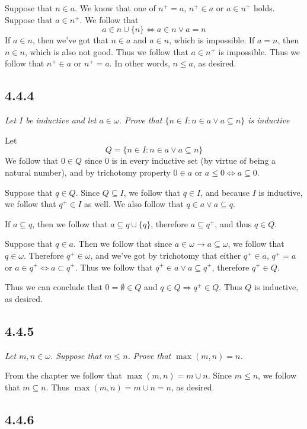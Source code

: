 \documentclass[11pt,oneside,titlepage]{book}
\DeclareMathOperator \lra {\Leftrightarrow}
\DeclareMathOperator \ra {\Rightarrow}
\begin{document}
Suppose that $n \in a$. We know that one of  $n^+ = a$, $n^+ \in a$ or $a \in n^+$ holds.
Suppose that $a \in n^+$. We follow that
$$a \in n \cup \{n\} \lra a \in n \lor a = n$$
If $a \in n$, then we've got that $n \in a$ and $a \in n$, which is impossible. If $a = n$,
then $n \in n$, which is also not good. Thus we follow that $a \in n^+$ is impossible.
Thus we follow that $n^+ \in a$ or $n^+ = a$. In other words, $n \leq a$, as desired.


\subsection*{4.4.4}

\textit{Let $I$ be inductive and let $a \in \omega$. Prove that
  $\{n \in I: n \in a \lor a \subseteq n\}$ is inductive }

Let
$$ Q = \{n \in I: n \in a \lor a \subseteq n\}$$
We follow that $0 \in Q$ since $0$ is in every inductive set (by virtue of being a natural number),
and by trichotomy property $0 \in a$ or $a \leq 0 \lra a \subseteq 0$.

Suppose that $q \in Q$. Since $Q \subseteq I$, we follow that $q \in I$, and
because $I$ is inductive, we follow that $q^+ \in I$ as well.
We also follow that $q \in a \lor a \subseteq q$.

If $a \subseteq q$, then we follow that $a \subseteq q \cup \{q\}$, therefore $a \subseteq q^+$,
and thus $q \in Q$.

Suppose that $q \in a$. Then we follow that since $a \in \omega \to a \subseteq \omega$,
we follow that $q \in \omega$. Therefore $q^+ \in \omega$, and
we've got by trichotomy that either $q^+ \in a$, $q^+ = a$ or $a \in q^+ \lra a \subset q^+$.
Thus we follow that $q^+ \in a \lor a \subseteq q^+$, therefore $q^+ \in Q$.

Thus we can conclude that $0 = \emptyset \in Q$ and $q \in Q \ra q^+ \in Q$. Thus $Q$ is
inductive, as desired.


\subsection*{4.4.5}

\textit{Let $m, n \in \omega$. Suppose that $m \leq n$. Prove that $\max(m, n) = n$.}

From the chapter we follow that $\max(m, n) = m \cup n$. Since $m \leq n$, we follow that
$m \subseteq n$. Thus $\max(m, n) = m \cup n = n$, as desired.

\subsection*{4.4.6}
\end{document}
